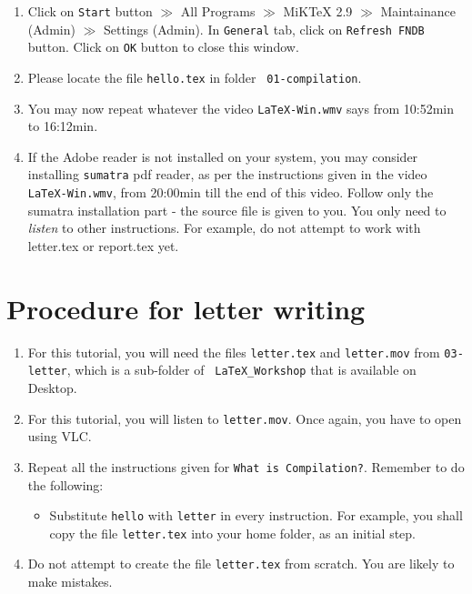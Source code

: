 \documentclass[11pt]{article}
\newenvironment{enumcpt}{\begin{enumerate} \topsep 0pt \partopsep 0pt 
                        \parsep 0pt
                        \itemsep 0pt \leftmargin -1in \rightmargin 0pt
                        }{\end{enumerate}}
\begin{document}
\begin{multicols}{2}
\begin{enumerate}
\item Click on {\tt Start} button $\gg$ All Programs $\gg$ MiKTeX 2.9
  $\gg$ Maintainance (Admin) $\gg$ Settings (Admin). In {\tt General} tab, click on {\tt Refresh
    FNDB} button. Click on {\tt OK} button to close this window.

\item Please locate the file {\tt hello.tex} in folder {\tt
  01-compilation}.
\item You may now repeat whatever the video {\tt LaTeX-Win.wmv} says
  from 10:52min to 16:12min.
\item If the Adobe reader is not installed on your system, you may
  consider installing {\tt sumatra} pdf reader, as per the
  instructions given in the video {\tt LaTeX-Win.wmv}, from 20:00min
  till the end of this video.  Follow only the sumatra installation
  part - the source file is given to you. You only need to
  \emph{listen} to other instructions.  For example, do not attempt to
  work with letter.tex or report.tex yet.
\end{enumerate}

\section{Procedure for letter writing}
\begin{enumcpt}
\item For this tutorial, you will need the files {\tt letter.tex} and
  {\tt letter.mov} from {\tt 03-letter}, which is a sub-folder of {\tt
    LaTeX\_Workshop} that is available on Desktop.
\item For this tutorial, you will listen to {\tt letter.mov}.  Once
  again, you have to open using VLC.  
\item Repeat all the instructions given for {\tt What is
    Compilation?}.  Remember to do the following:
\begin{itemize}
\item Substitute {\tt hello} with {\tt letter} in every instruction.
  For example, you shall copy the file {\tt letter.tex} into your home
  folder, as an initial step.
  \end{itemize}
\item Do not attempt to create the file {\tt letter.tex} from
  scratch.  You are likely to make mistakes.
\end{enumcpt}


\end{multicols}
\end{document}

